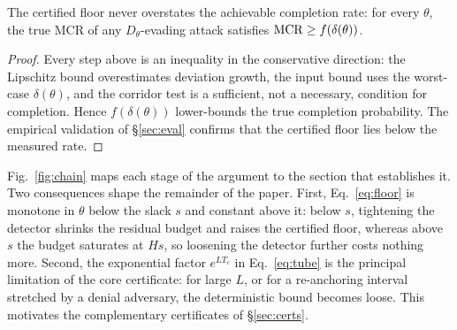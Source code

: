 \begin{proposition}[Soundness]
\label{prop:sound}
The certified floor never overstates the achievable completion rate: for every
$\theta$, the true MCR of any $D_\theta$-evading attack satisfies
$\mathrm{MCR}\ge f(\delta(\theta))$.
\end{proposition}
\begin{proof}
Every step above is an inequality in the conservative direction: the Lipschitz
bound overestimates deviation growth, the input bound uses the worst-case
$\delta(\theta)$, and the corridor test is a sufficient, not a necessary, condition for
completion. Hence $f(\delta(\theta))$ lower-bounds the
true completion probability. The empirical validation of \S\ref{sec:eval}
confirms that the certified floor lies below the measured rate.
\end{proof}

Fig.~\ref{fig:chain} maps each stage of the argument to the section that
establishes it. Two consequences shape the remainder of the paper. First,
Eq.~\eqref{eq:floor} is monotone in $\theta$ below the slack $s$ and constant
above it: below $s$, tightening the detector shrinks the residual budget and
raises the certified floor, whereas above $s$ the budget saturates at $Hs$, so
loosening the detector further costs nothing more. Second, the exponential factor
$e^{LT_c}$ in Eq.~\eqref{eq:tube} is the principal limitation of the core
certificate: for large $L$, or for a re-anchoring interval stretched by a denial
adversary, the deterministic bound becomes loose. This motivates the
complementary certificates of \S\ref{sec:certs}.

